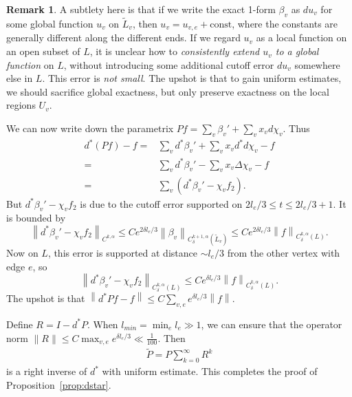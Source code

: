 \documentclass{article}
\theoremstyle{definition}
\newtheorem{rmk}{Remark}
\newcommand{\norm}[1]{\left\lVert#1\right\rVert}
\newcommand{\Lap}{\Delta}
\begin{document}
	
	\begin{rmk}
		A subtlety here is that if we write the exact 1-form $\beta_v$ as $du_v$ for some global function $u_v$ on $\tilde{L}_v$, then $u_v= u_{v,e}+ \text{const}$, where the constants are generally different along the different ends. If we regard $u_v$ as a local function on an open subset of $L$, it is unclear how to \emph{consistently extend $u_v$ to a global function} on $L$, without introducing some additional cutoff error $du_v$ somewhere else in $L$. This error is \emph{not small}. The upshot is that to gain uniform estimates, we should sacrifice global exactness, but only preserve exactness on the local regions $U_v$.
		
		
	\end{rmk}
	
	
	We can now write down the parametrix
	$
	Pf
	= \sum_v \beta_v' + \sum_v x_vd\chi_v.
	$
	Thus 
	\[
	\begin{split}
		d^*(Pf)-f = & \sum_v d^*\beta_v'+ \sum_v  x_vd^*d \chi_v-f
		\\
		= & \sum_v d^*\beta_v'- \sum_v x_v\Lap \chi_v- f
		\\
		= & \sum_v (d^*\beta_v'- \chi_v f_2).
	\end{split}
	\]
	But $d^*\beta_v'- \chi_v f_2$ is due to the cutoff error supported on $2l_e/3\leq t\leq 2l_e/3+1$. It is bounded by
	\[
	\norm{d^*\beta_v'- \chi_v f_2}_{C^{k,\alpha}}\leq C e^{2\delta l_e/3}\norm{\beta_v}_{C^{k+1,\alpha}_\delta(\tilde{L}_v) } \leq  C e^{2\delta l_e/3} \norm{ f   }_{C^{k,\alpha}_\delta (L) } .
	\]
	Now on $L$, this error is supported at distance $\sim l_e/3$ from the other vertex with edge $e$, so 
	\[
	\norm{d^*\beta_v'- \chi_v f_2}_{C^{k,\alpha}_\delta(L)  } \leq C e^{\delta l_e/3} \norm{ f   }_{C^{k,\alpha}_\delta (L) }.
	\]
	The upshot is that $\norm{ d^* Pf-f }\leq C\sum_{v,e} e^{\delta l_e/3} \norm{f} $.
	
	
	
	Define $R = I- d^* P $. When $l_{min}=\min_e l_e\gg 1$, we can
	ensure that the operator norm $\|R\| \leq C \max_{v,e} e^{\delta l_e/3} \ll \frac{1}{100}$. Then 
	\begin{align*}
		\tilde{P} = P\sum_{k=0}^\infty R^k 
	\end{align*}
	is a right inverse of $d^*$ with uniform estimate.
	This completes the proof of Proposition~\ref{prop:dstar}.
	
\end{document}
